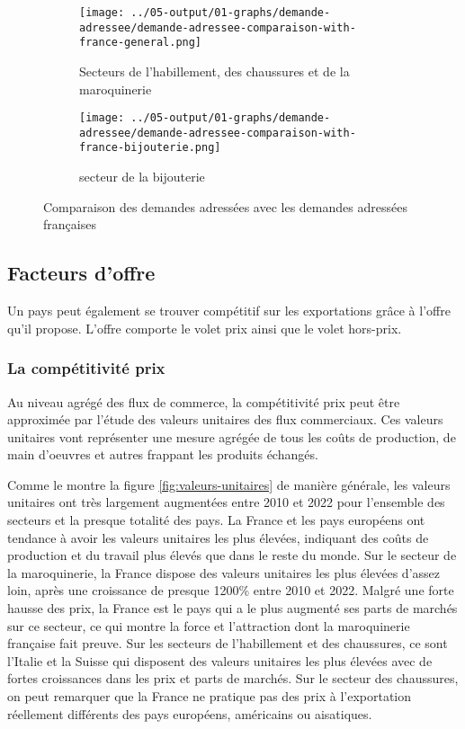\documentclass[french,10pt,a4paper]{article}
\begin{document}
\begin{figure}[!h]
  \centering
  \begin{subfigure}{\textwidth}
    \centering    \texttt{[image: ../05-output/01-graphs/demande-adressee/demande-adressee-comparaison-with-france-general.png]}
    \caption{Secteurs de l'habillement, des chaussures et de la maroquinerie}
    \label{fig:demande-adressee-comparaison-with-france-general}
  \end{subfigure}
  \vspace{0.5cm}
  \begin{subfigure}{\textwidth}
    \centering \texttt{[image: ../05-output/01-graphs/demande-adressee/demande-adressee-comparaison-with-france-bijouterie.png]}
 \caption{secteur de la bijouterie}
 \label{fig:demande-adressee-comparaison-with-france-bijouterie}
  \end{subfigure}
  \caption{Comparaison des demandes adressées avec les demandes adressées françaises}
  \label{fig:demande-adressee}
\end{figure}


\subsection{Facteurs d'offre}
Un pays peut également se trouver compétitif sur les exportations grâce à l'offre qu'il propose. L'offre comporte le volet prix ainsi que le volet hors-prix.


\subsubsection{La compétitivité prix}
Au niveau agrégé des flux de commerce, la compétitivité prix peut être approximée par l'étude des valeurs unitaires des flux commerciaux. Ces valeurs unitaires vont représenter une mesure agrégée de tous les coûts de production, de main d'oeuvres et autres frappant les produits échangés.

Comme le montre la figure \ref{fig:valeurs-unitaires} de manière générale, les valeurs unitaires ont très largement augmentées entre 2010 et 2022 pour l'ensemble des secteurs et la presque totalité des pays. La France et les pays européens ont tendance à avoir les valeurs unitaires les plus élevées, indiquant des coûts de production et du travail plus élevés que dans le reste du monde. Sur le secteur de la maroquinerie, la France dispose des valeurs unitaires les plus élevées d'assez loin, après une croissance de presque 1200\% entre 2010 et 2022. Malgré une forte hausse des prix, la France est le pays qui a le plus augmenté ses parts de marchés sur ce secteur, ce qui montre la force et l'attraction dont la maroquinerie française fait preuve. Sur les secteurs de l'habillement et des chaussures, ce sont l'Italie et la Suisse qui disposent des valeurs unitaires les plus élevées avec de fortes croissances dans les prix et parts de marchés. Sur le secteur des chaussures, on peut remarquer que la France ne pratique pas des prix à l'exportation réellement différents des pays européens, américains ou aisatiques.
\end{document}
